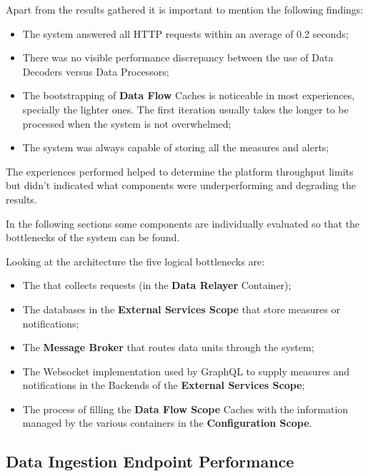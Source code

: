 Apart from the results gathered it is important to mention the following findings:

\begin{itemize}
    \item The system answered all HTTP requests within an average of 0.2 seconds;
    \item There was no visible performance discrepancy between the use of Data Decoders versus Data Processors;
    \item The bootstrapping of \textbf{Data Flow} Caches is noticeable in most experiences, specially the lighter ones. The first iteration usually takes the longer to be processed when the system is not overwhelmed;
    \item The system was always capable of storing all the measures and alerts;
\end{itemize}

The experiences performed helped to determine the platform throughput limits but didn't indicated what components were underperforming and degrading the results.

In the following sections some components are individually evaluated so that the bottlenecks of the system can be found. 

Looking at the architecture the five logical bottlenecks are:

\begin{itemize}
    \item The  that collects requests (in the \textbf{Data Relayer} Container);
    \item The databases in the \textbf{External Services Scope} that store measures or notifications;
    \item The \textbf{Message Broker} that routes data units through the system;
    \item The Websocket implementation used by GraphQL to supply measures and notifications in the Backends of the \textbf{External Services Scope};
    \item The process of filling the \textbf{Data Flow Scope} Caches with the information managed by the various containers in the \textbf{Configuration Scope}.
\end{itemize}

\subsection{Data Ingestion Endpoint Performance}
\label{subsec:evaluation:overview:endpoint}

